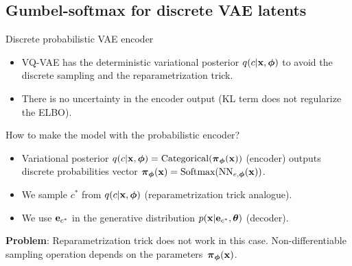 \documentclass{beamer}
\begin{document}
\subsection{Gumbel-softmax for discrete VAE latents}
\begin{frame}{Discrete probabilistic VAE encoder}
	\begin{itemize}
		\item VQ-VAE has the deterministic variational posterior $q(c | \mathbf{x}, \boldsymbol{\phi})$ to avoid the discrete sampling and the reparametrization trick.
		\item There is no uncertainty in the encoder output (KL term does not regularize the ELBO). 
	\end{itemize}
	\begin{block}{How to make the model with the probabilistic encoder?}
		\begin{itemize}
			\item Variational posterior $q(c | \mathbf{x}, \boldsymbol{\phi}) = \text{Categorical}(\boldsymbol{\pi}_{\boldsymbol{\phi}}(\mathbf{x}))$ (encoder) outputs discrete probabilities vector $\boldsymbol{\pi}_{\boldsymbol{\phi}}(\mathbf{x}) = \text{Softmax}(\text{NN}_{e, \boldsymbol{\phi}}(\mathbf{x}))$.
			\item We sample $c^*$ from $q(c | \mathbf{x}, \boldsymbol{\phi})$ (reparametrization trick analogue).
			\item We use $\mathbf{e}_{c^*}$ in the generative distribution $p(\mathbf{x} | \mathbf{e}_{c^*}, \boldsymbol{\theta})$ (decoder).
		\end{itemize}
	\end{block}
	\textbf{Problem}: Reparametrization trick does not work in this case. Non-differentiable sampling operation depends on the parameters~$\boldsymbol{\pi}_{\boldsymbol{\phi}}(\mathbf{x})$.
\end{frame}
\end{document}
